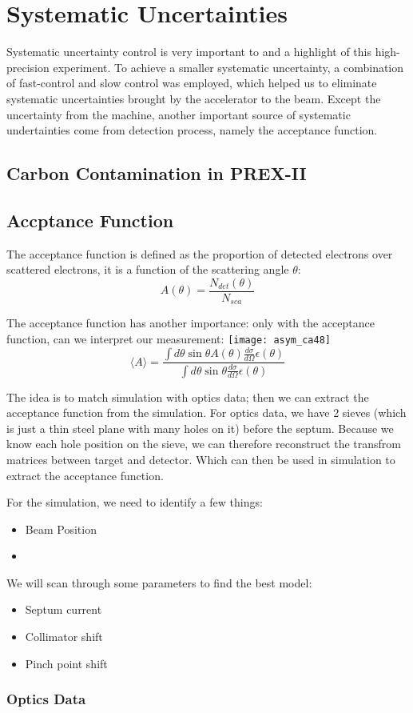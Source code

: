 \chapter{Systematic Uncertainties}

Systematic uncertainty control is very important to and a highlight of this 
high-precision experiment. To achieve a smaller systematic uncertainty, a
combination of fast-control and slow control was employed, which helped us
to eliminate systematic uncertainties brought by the accelerator to the
beam. Except the uncertainty from the machine, another important source
of systematic undertainties come from detection process, namely the 
acceptance function.

\section{Carbon Contamination in PREX-II}

\section{Accptance Function}
The acceptance function is defined as the proportion of detected electrons
over scattered electrons, it is a function of the scattering angle $\theta$:
$$ A(\theta) = \frac{N_{det}(\theta)}{N_{sca}} $$

The acceptance function has another importance: only with the acceptance
function, can we interpret our measurement:
\texttt{[image: asym\_ca48]}
\begin{equation*}
    \langle A \rangle = \frac{\int d\theta \sin\theta A(\theta) \frac{d\sigma}{d\Omega} \epsilon(\theta)}{\int d\theta \sin\theta \frac{d\sigma}{d\Omega} \epsilon(\theta)}
\end{equation*}

The idea is to match simulation with optics data; then we can extract the 
acceptance function from the simulation. For optics data, we have 2 sieves
(which is just a thin steel plane with many holes on it) before the septum.
Because we know each hole position on the sieve, we can therefore reconstruct
the transfrom matrices between target and detector. Which can then be used in
simulation to extract the acceptance function.

For the simulation, we need to identify a few things:
\begin{itemize}
    \item Beam Position
    \item 
\end{itemize}

We will scan through some parameters to find the best model:
\begin{itemize}
    \item Septum current
    \item Collimator shift
    \item Pinch point shift
\end{itemize}

\subsection{Optics Data}
